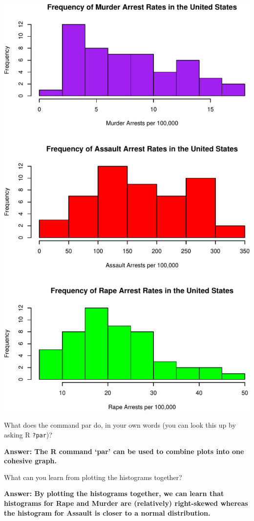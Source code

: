 \documentclass[
]{article}
\begin{document}
\includegraphics{Assignments_files/figure-latex/unnamed-chunk-11-1.pdf}

What does the command par do, in your own words (you can look this up by
asking R \texttt{?par})?

\textbf{Answer: The R command `par' can be used to combine plots into
one cohesive graph. }

What can you learn from plotting the histograms together?

\textbf{Answer: By plotting the histograms together, we can learn that
histograms for Rape and Murder are (relatively) right-skewed whereas the
histogram for Assault is closer to a normal distribution. }
\end{document}
